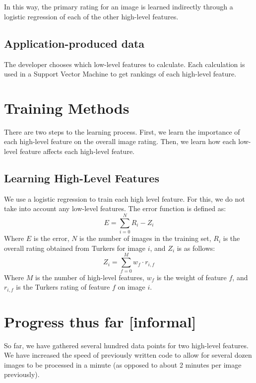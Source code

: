 \documentclass[11pt,letter]{article}
\begin{document}
\\
\\

In this way, the primary rating for an image is learned indirectly through a logistic regression of each of the other high-level features.

\subsection{Application-produced data}
The developer chooses which low-level features to calculate. Each calculation is used in a Support Vector Machine to get rankings of each high-level feature.

\section{Training Methods}
\label{methods}

There are two steps to the learning process. First, we learn the importance of each high-level feature on the overall image rating. Then, we learn how each low-level feature affects each high-level feature.


\subsection{Learning High-Level Features}
We use a logistic regression to train each high level feature. For this, we do not take into account any low-level features. The error function is defined as:
\[
E=\displaystyle\sum\limits_{i=0}^N R_i-Z_i
\]
Where $E$ is the error, $N$ is the number of images in the training set, $R_i$ is the overall rating obtained from Turkers for image $i$, and $Z_i$ is as follows:
\[
Z_i=\displaystyle\sum\limits_{f=0}^M w_f \cdot r_{i,f}
\]
Where $M$ is the number of high-level features, $w_f$ is the weight of feature $f$, and $r_{i,f}$ is the Turkers rating of feature $f$ on image $i$.


\section{Progress thus far [informal]}
So far, we have gathered several hundred data points for two high-level features. We have increased the speed of previously written code to allow for several dozen images to be processed in a minute (as opposed to about 2 minutes per image previously).
\end{document}
